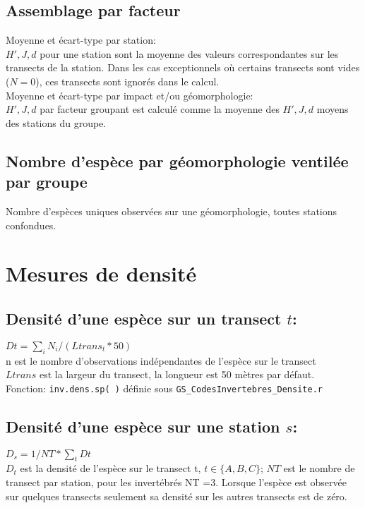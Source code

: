 \documentclass{article}
\begin{document}
\subsection{Assemblage par facteur}

Moyenne et écart-type par station: \\
$H', J, d$ pour une station sont la moyenne des valeurs correspondantes
sur les transects de la station. Dans les cas exceptionnels où certains transects sont vides
($N=0$), ces transects sont ignorés dans le calcul. 
\\
Moyenne et écart-type par impact et/ou géomorphologie: \\
$H', J, d$ par facteur groupant est calculé comme la moyenne des $H',
J, d$ moyens des stations du groupe. 

\subsection{Nombre d'espèce par géomorphologie ventilée par groupe}
Nombre d'espèces uniques observées sur une géomorphologie, toutes
stations confondues. 



\newpage

\section{Mesures de densité}
\subsection{Densité d'une espèce sur un transect $t$: }
$\displaystyle Dt = \sum_i N_i / (Ltrans_t * 50)$ \\
n est le nombre d'observations indépendantes de l'espèce sur le
transect\\
$Ltrans$ est la largeur du transect, la longueur est 50 mètres par
défaut. \\

\noindent Fonction: \texttt{inv.dens.sp( )} définie sous \texttt{GS\_CodesInvertebres\_Densite.r}

\subsection{Densité d'une espèce sur une station $s$:}

$\displaystyle D_s = 1/NT * \sum_t Dt $ \\
$D_t$ est la densité de l'espèce sur le transect t, $ t \in \{ A, B, C
\}$; 
$NT$ est le nombre de transect par station, pour les invertébrés NT =3. 
Lorsque l'espèce est observée sur quelques transects seulement sa
densité sur les autres transects est de zéro. 
\end{document}
